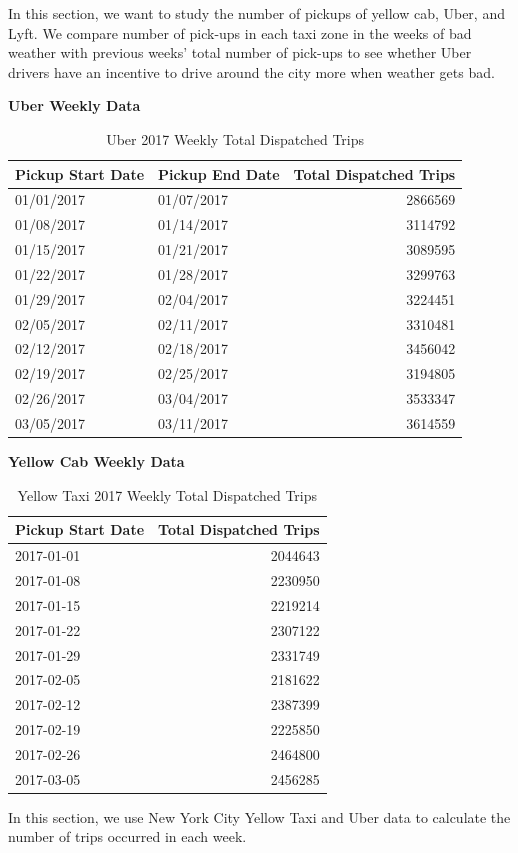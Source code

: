 \documentclass[12pt,twoside]{reedthesis}
\theoremstyle{definition}
\theoremstyle{definition}
\theoremstyle{definition}
\theoremstyle{remark}
\begin{document}
In this section, we want to study the number of pickups of yellow cab,
Uber, and Lyft. We compare number of pick-ups in each taxi zone in the
weeks of bad weather with previous weeks' total number of pick-ups to
see whether Uber drivers have an incentive to drive around the city more
when weather gets bad.

\textbf{Uber Weekly Data}
\begin{table}

\caption{\label{tab:unnamed-chunk-51}Uber 2017 Weekly Total Dispatched Trips}
\centering
\begin{tabular}[t]{l|l|r}
\hline
Pickup Start Date & Pickup End Date & Total Dispatched Trips\\
\hline
01/01/2017 & 01/07/2017 & 2866569\\
\hline
01/08/2017 & 01/14/2017 & 3114792\\
\hline
01/15/2017 & 01/21/2017 & 3089595\\
\hline
01/22/2017 & 01/28/2017 & 3299763\\
\hline
01/29/2017 & 02/04/2017 & 3224451\\
\hline
02/05/2017 & 02/11/2017 & 3310481\\
\hline
02/12/2017 & 02/18/2017 & 3456042\\
\hline
02/19/2017 & 02/25/2017 & 3194805\\
\hline
02/26/2017 & 03/04/2017 & 3533347\\
\hline
03/05/2017 & 03/11/2017 & 3614559\\
\hline
\end{tabular}
\end{table}
\textbf{Yellow Cab Weekly Data}
\begin{table}

\caption{\label{tab:unnamed-chunk-54}Yellow Taxi 2017 Weekly Total Dispatched Trips}
\centering
\begin{tabular}[t]{l|r}
\hline
Pickup Start Date & Total Dispatched Trips\\
\hline
2017-01-01 & 2044643\\
\hline
2017-01-08 & 2230950\\
\hline
2017-01-15 & 2219214\\
\hline
2017-01-22 & 2307122\\
\hline
2017-01-29 & 2331749\\
\hline
2017-02-05 & 2181622\\
\hline
2017-02-12 & 2387399\\
\hline
2017-02-19 & 2225850\\
\hline
2017-02-26 & 2464800\\
\hline
2017-03-05 & 2456285\\
\hline
\end{tabular}
\end{table}
In this section, we use New York City Yellow Taxi and Uber data to
calculate the number of trips occurred in each week.
\end{document}

